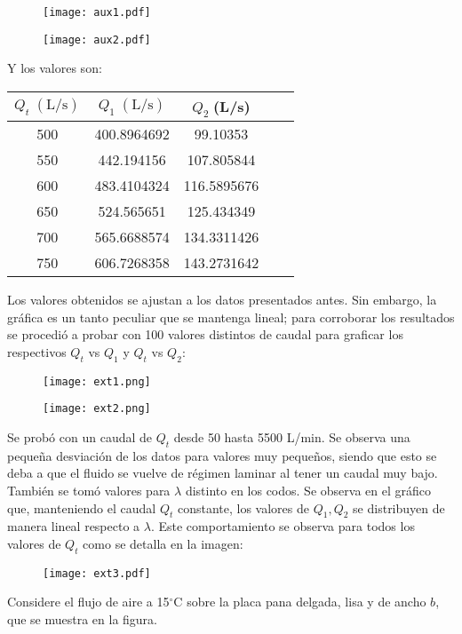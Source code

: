 \documentclass[a4paper,12pt]{exam}
\begin{document}
\begin{questions}
\begin{parts}
\begin{figure}[H]
\centering
\texttt{[image: aux1.pdf]}
\end{figure}
\begin{figure}[H]
\centering
\texttt{[image: aux2.pdf]}
\end{figure}
Y los valores son:
\begin{center}
\begin{tabular}{|c|c|c|c|c|}
\hline 
$Q_{t}\;(\mathrm{L/s})$ & $Q_{1}\;(\mathrm{L/s})$ & $Q_{2}\;$(L/s) \\ 
\hline 
500 & 400.8964692 & 99.10353\\ 
\hline 
550 & 442.194156 & 107.805844\\ 
\hline 
600 & 483.4104324 & 116.5895676\\ 
\hline 
650 & 524.565651 & 125.434349\\ 
\hline 
700 & 565.6688574 & 134.3311426\\ 
\hline 
750 & 606.7268358 & 143.2731642\\ 
\hline 
\end{tabular} 
\end{center}
Los valores obtenidos se ajustan a los datos presentados antes. Sin embargo, la gráfica es un tanto peculiar que se mantenga lineal; para corroborar los resultados se procedió a probar con 100 valores distintos de caudal para graficar los respectivos $Q_{t}$ vs $Q_{1}$ y $Q_{t}$ vs $Q_{2}$: 
\begin{figure}[H]
\centering
\texttt{[image: ext1.png]}
\end{figure}
\begin{figure}[H]
\centering
\texttt{[image: ext2.png]}
\end{figure}
Se probó con un caudal de $Q_{t}$ desde 50 hasta 5500 L/min. Se observa una pequeña desviación de los datos para valores muy pequeños, siendo que esto se deba a que el fluido se vuelve de régimen laminar al tener un caudal muy bajo.\\
También se tomó valores para $\lambda$ distinto en los codos. Se observa en el gráfico que, manteniendo el caudal $Q_{t}$ constante, los valores de $Q_{1}, Q_{2}$ se distribuyen de manera lineal respecto a $\lambda$. Este comportamiento se observa para todos los valores de $Q_{t}$ como se detalla en la imagen:
\begin{figure}[H]
\centering
\texttt{[image: ext3.pdf]}
\end{figure}
\end{parts}
\newpage
\question[4] Considere el flujo de aire a 15$^{\circ}$C sobre la placa pana delgada, lisa y de ancho $b$, que se muestra en la figura.

\end{questions}
\end{document}
